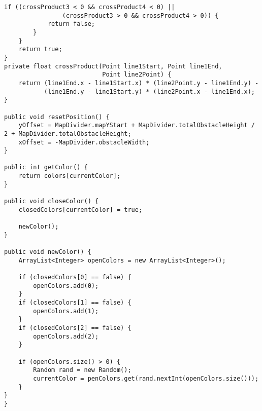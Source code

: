 \begin{lstlisting}[style=csharp,label=car_class, caption={Car class from the original Cars project.}]
		if ((crossProduct3 < 0 && crossProduct4 < 0) ||
				(crossProduct3 > 0 && crossProduct4 > 0)) {
			return false;
		}
	}		
	return true;
}
private float crossProduct(Point line1Start, Point line1End,
						   Point line2Point) {
	return (line1End.x - line1Start.x) * (line2Point.y - line1End.y) -
		   (line1End.y - line1Start.y) * (line2Point.x - line1End.x);
}
	
public void resetPosition() {
	yOffset = MapDivider.mapYStart + MapDivider.totalObstacleHeight / 2 + MapDivider.totalObstacleHeight;
	xOffset = -MapDivider.obstacleWidth;
}
	
public int getColor() {
	return colors[currentColor];
}
	
public void closeColor() {
	closedColors[currentColor] = true;
	
	newColor();
}
	
public void newColor() {
	ArrayList<Integer> openColors = new ArrayList<Integer>();
	
	if (closedColors[0] == false) {
		openColors.add(0);
	}
	if (closedColors[1] == false) {
		openColors.add(1);
	}
	if (closedColors[2] == false) {
		openColors.add(2);
	}
		
	if (openColors.size() > 0) {
		Random rand = new Random();
		currentColor = penColors.get(rand.nextInt(openColors.size()));
	}
}
}
\end{lstlisting}